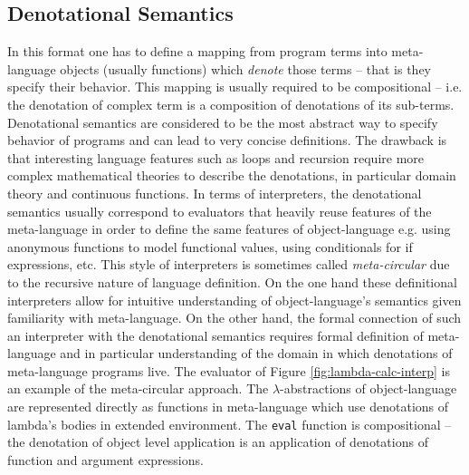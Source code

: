 \subsection*{Denotational Semantics}
In this format one has to define a mapping from program terms into meta-language objects (usually functions) which \emph{denote} those terms -- that is they specify their behavior.
This mapping is usually required to be compositional -- i.e. the denotation of complex term is a composition of denotations of its sub-terms.
Denotational semantics are considered to be the most abstract way to specify behavior of programs and can lead to very concise definitions.
The drawback is that interesting language features such as loops and recursion require more complex mathematical theories to describe the denotations, in particular domain theory and continuous functions.
In terms of interpreters, the denotational semantics usually correspond to evaluators that heavily reuse features of the meta-language in order to define the same features of object-language e.g. using anonymous functions to model functional values, using conditionals for if expressions, etc.
This style of interpreters is sometimes called \textit{meta-circular} due to the recursive nature of language definition.
On the one hand these definitional interpreters allow for intuitive understanding of object-language's semantics given familiarity with meta-language.
On the other hand, the formal connection of such an interpreter with the denotational semantics requires formal definition of meta-language and in particular understanding of the domain in which denotations of meta-language programs live.
The evaluator of Figure \ref{fig:lambda-calc-interp} is an example of the meta-circular approach.
The $\lambda$-abstractions of object-language are represented directly as functions in meta-language which use denotations of lambda's bodies in extended environment.
The \lstinline!eval! function is compositional -- the denotation of object level application is an application of denotations of function and argument expressions.


